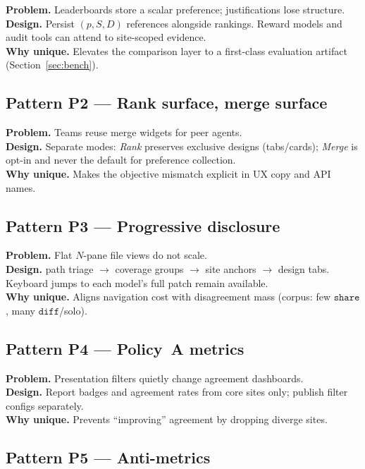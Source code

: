 \documentclass[
  11pt,
  a4paper,
  oneside,
  numbers=noenddot,
  abstract=true,
  headings=normal,
  DIV=11,
  BCOR=0mm,
]{scrartcl}
\theoremstyle{definition}
\theoremstyle{plain}
\theoremstyle{remark}
\newcommand{\badge}[1]{\texttt{#1}}
\begin{document}
\textbf{Problem.} Leaderboards store a scalar preference; justifications
lose structure.\\
\textbf{Design.} Persist $(p,S,D)$ references alongside rankings. Reward
models and audit tools can attend to site-scoped evidence.\\
\textbf{Why unique.} Elevates the comparison layer to a first-class
evaluation artifact (Section~\ref{sec:bench}).

\subsection{Pattern P2 --- Rank surface, merge surface}

\textbf{Problem.} Teams reuse merge widgets for peer agents.\\
\textbf{Design.} Separate modes: \emph{Rank} preserves exclusive designs
(tabs/cards); \emph{Merge} is opt-in and never the default for preference
collection.\\
\textbf{Why unique.} Makes the objective mismatch explicit in UX copy and
API names.

\subsection{Pattern P3 --- Progressive disclosure}

\textbf{Problem.} Flat $N$-pane file views do not scale.\\
\textbf{Design.} path triage $\rightarrow$ coverage groups $\rightarrow$
site anchors $\rightarrow$ design tabs. Keyboard jumps to each model's full
patch remain available.\\
\textbf{Why unique.} Aligns navigation cost with disagreement mass
(corpus: few $\badge{share}$, many $\badge{diff}$/solo).

\subsection{Pattern P4 --- Policy~A metrics}

\textbf{Problem.} Presentation filters quietly change agreement dashboards.\\
\textbf{Design.} Report badges and agreement rates from core sites only;
publish filter configs separately.\\
\textbf{Why unique.} Prevents ``improving'' agreement by dropping diverge
sites.

\subsection{Pattern P5 --- Anti-metrics}
\end{document}
